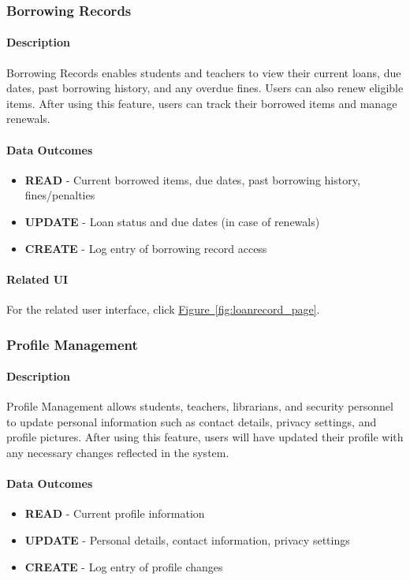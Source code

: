 \documentclass[12pt]{article}
\begin{document}
\subsubsection{Borrowing Records}

\paragraph{Description}
Borrowing Records enables students and teachers to view their current loans, due dates, past borrowing history, and any overdue fines. Users can also renew eligible items. After using this feature, users can track their borrowed items and manage renewals.

\paragraph{Data Outcomes}
\begin{itemize}
    \item \textbf{READ} - Current borrowed items, due dates, past borrowing history, fines/penalties
    \item \textbf{UPDATE} - Loan status and due dates (in case of renewals)
    \item \textbf{CREATE} - Log entry of borrowing record access
\end{itemize}

\paragraph{Related UI}
For the related user interface, click \hyperref[fig:loanrecord_page]{Figure~\ref*{fig:loanrecord_page}}.

\subsubsection{Profile Management}

\paragraph{Description}
Profile Management allows students, teachers, librarians, and security personnel to update personal information such as contact details, privacy settings, and profile pictures. After using this feature, users will have updated their profile with any necessary changes reflected in the system.

\paragraph{Data Outcomes}
\begin{itemize}
    \item \textbf{READ} - Current profile information
    \item \textbf{UPDATE} - Personal details, contact information, privacy settings
    \item \textbf{CREATE} - Log entry of profile changes
\end{itemize}
\end{document}
